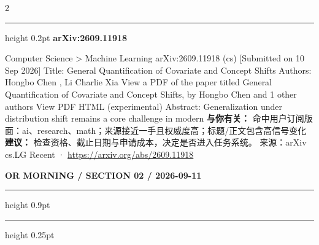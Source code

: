 \documentclass[10.5pt]{ctexart}
\begin{document}
\begin{multicols}{2}
\vspace{2mm}
\hrule height 0.2pt
\vspace{2mm}
{\large\bfseries arXiv:2609.11918}\par
Computer Science > Machine Learning arXiv:2609.11918 (cs) [Submitted on 10 Sep 2026] Title: General Quantification of Covariate and Concept Shifts Authors: Hongbo Chen , Li Charlie Xia View a PDF of the paper titled General Quantification of Covariate and Concept Shifts, by Hongbo Chen and 1 other authors View PDF HTML (experimental) Abstract: Generalization under distribution shift remains a core challenge in modern
\textbf{与你有关：} 命中用户订阅版面：ai、research、math；来源接近一手且权威度高；标题/正文包含高信号变化
\textbf{建议：} 检查资格、截止日期与申请成本，决定是否进入任务系统。
{\footnotesize\color{ormuted} 来源：arXiv cs.LG Recent · \url{https://arxiv.org/abs/2609.11918}}
\end{multicols}
\newpage
{\small\bfseries OR MORNING / SECTION 02 / 2026-09-11}
\vspace{2mm}
\hrule height 0.9pt
\vspace{1.5mm}
\hrule height 0.25pt
\vspace{4mm}
\end{document}
